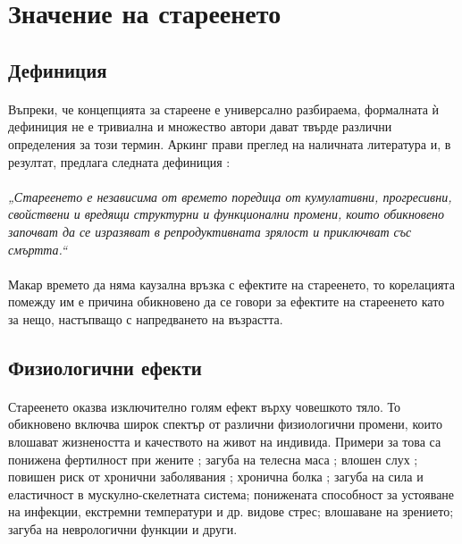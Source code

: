 \documentclass[pdftex,cyrillic,14pt,a4page,twoside,openright]{extreport}
\begin{document}
\section{Значение на стареенето}
\subsection{Дефиниция}
\paragraph{}
Въпреки, че концепцията за стареене е универсално разбираема, формалната ѝ дефиниция не е тривиална и множество автори дават твърде различни определения за този термин. Аркинг прави преглед на наличната литература и, в резултат, предлага следната дефиниция \cite{arking2006biology}:

\paragraph{}
\textit{„Стареенето е независима от времето поредица от кумулативни, прогресивни, свойствени и вредящи структурни и функционални промени, които обикновено започват да се изразяват в репродуктивната зрялост и приключват със смъртта.“}

\paragraph{}
Макар времето да няма каузална връзка с ефектите на стареенето, то корелацията помежду им е причина обикновено да се говори за ефектите на стареенето като за нещо, настъпващо с напредването на възрастта.

\subsection{Физиологични ефекти}
\paragraph{}
Стареенето оказва изключително голям ефект върху човешкото тяло. То обикновено включва широк спектър от различни физиологични промени, които влошават жизнеността и качеството на живот на индивида. Примери за това са понижена фертилност при жените \cite{kamath2010}; загуба на телесна маса \cite{spencer1996}; влошен слух \cite{feder2015}; повишен риск от хронични заболявания \cite{larson2013, prasad2012}; хронична болка \cite{geriatrics2002}; загуба на сила и еластичност в мускулно-скелетната система; понижената способност за устояване на инфекции, екстремни температури и др. видове стрес; влошаване на зрението; загуба на неврологични функции \cite{vina2007} и други.
\end{document}
